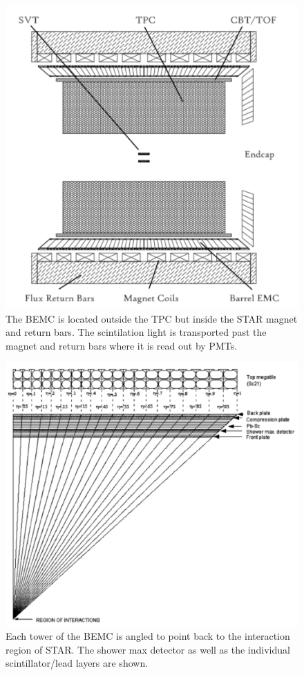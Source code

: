 \documentclass[abstract = on,listof=totoc, bibliography=totoc]{scrreprt}
\begin{document}
\begin{figure}
\begin{center}
\includegraphics[width = .7\textwidth]{BEMC1}
\caption[Barrel Electromagnetic Calorimeter]{The BEMC is located outside the TPC but inside the STAR magnet and return bars. The scintilation light is transported past the magnet and return bars where it is read out by PMTs.}
\label{fig:BEMC1}
\end{center}
\end{figure}

\begin{figure}
\begin{center}
\includegraphics[width = .7\textwidth]{BEMC2}
\caption[Barrel Electromagnetic Calorimeter 2]{Each tower of the BEMC is angled to point back to the interaction region of STAR. The shower max detector as well as the individual scintillator/lead layers are shown.}
\label{fig:BEMC2}
\end{center}
\end{figure}
\end{document}
